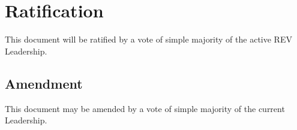 \section{Ratification}
\label{ratification}

This document will be ratified by a vote of simple majority of the active REV Leadership.

\subsection{Amendment}
\label{ratification:amendment}

This document may be amended by a vote of simple majority of the current Leadership.